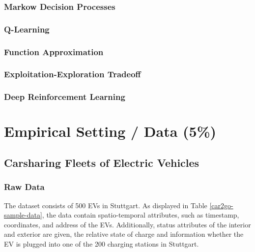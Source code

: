 \documentclass[12pt, article]{article}
\begin{document}
\subsubsection{Markow Decision Processes}
\label{sec:org6909b1c}
\subsubsection{Q-Learning}
\label{sec:org356349b}
\subsubsection{Function Approximation}
\label{sec:org71125e7}
\subsubsection{Exploitation-Exploration Tradeoff}
\label{sec:orgc2849b1}
\subsubsection{Deep Reinforcement Learning}
\label{sec:org62ea073}
\section{Empirical Setting / Data (5\%)}
\label{sec:orga725db2}
\subsection{Carsharing Fleets of Electric Vehicles}
\label{sec:org1d3cf0d}
\subsubsection{Raw Data}
\label{sec:org990e317}
The dataset consists of 500 EVs in Stuttgart. As displayed in Table
\ref{car2go-sample-data}, the data contain spatio-temporal attributes, such as
timestamp, coordinates, and address of the EVs. Additionally, status attributes
of the interior and exterior are given, the relative state of charge and
information whether the EV is plugged into one of the 200 charging stations in
Stuttgart.
\end{document}
